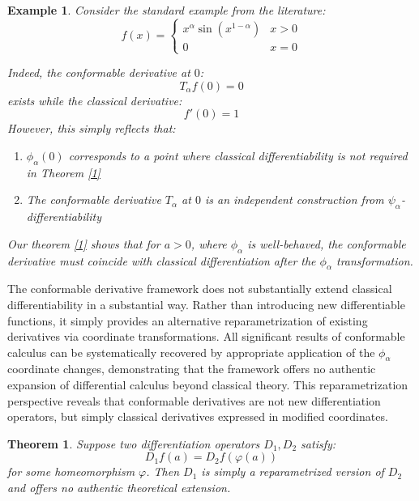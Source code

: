 \documentclass[preprint,12pt]{elsarticle}
\newtheorem{theorem}{Theorem}
\newtheorem{example}{Example}
\begin{document}
\begin{example}
Consider the standard example from the literature:
\[
f(x) = \begin{cases}
x^\alpha \sin(x^{1-\alpha}) & x > 0 \\
0 & x = 0
\end{cases}
\]

Indeed, the conformable derivative at $0$:
\[
T_\alpha f(0) = 0
\]
exists while the classical derivative:
\[
f'(0) = 1
\]
However, this simply reflects that:
\begin{enumerate}
\item $\phi_\alpha(0)$ corresponds to a point where classical differentiability is not required in Theorem \ref{1}

\item The conformable derivative $T_\alpha$ at $0$ is an independent construction from $\psi_\alpha$-differentiability
\end{enumerate}
Our theorem \ref{1} shows that for $a > 0$, where $\phi_\alpha$ is well-behaved, the conformable derivative must coincide with classical differentiation after the $\phi_\alpha$ transformation.
\end{example}

The conformable derivative framework does not substantially extend classical differentiability in a substantial way. Rather than introducing new differentiable functions, it simply provides an alternative reparametrization of existing derivatives via coordinate transformations. All significant results of conformable calculus can be systematically recovered by appropriate application of the $\phi_\alpha$ coordinate changes, demonstrating that the framework offers no authentic expansion of differential calculus beyond classical theory. This reparametrization perspective reveals that conformable derivatives are not new differentiation operators, but simply classical derivatives expressed in modified coordinates.

\begin{theorem} Suppose two differentiation operators $D_1, D_2$ satisfy:
\[
D_1 f(a) = D_2 f(\varphi(a))
\]
for some homeomorphism $\varphi$. Then $D_1$ is simply a reparametrized version of $D_2$ and offers no authentic theoretical extension.
\end{theorem}
\end{document}
